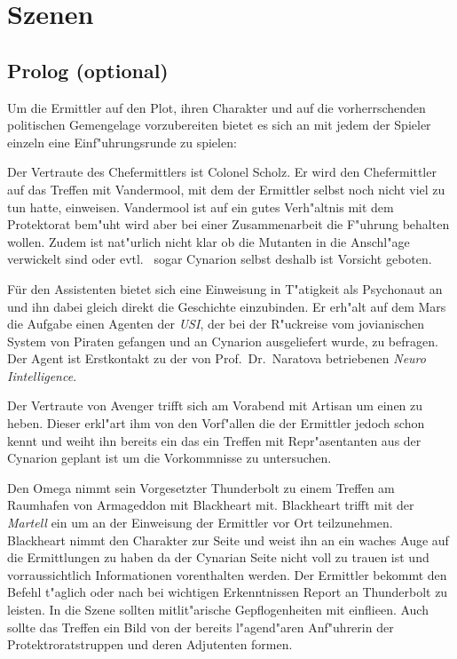 \section{Szenen}

\subsection{Prolog (optional)}

Um die Ermittler auf den Plot, ihren Charakter und auf die vorherrschenden politischen Gemengelage vorzubereiten bietet es sich an mit jedem der Spieler einzeln eine Einf"uhrungsrunde zu spielen:

Der Vertraute des Chefermittlers ist Colonel Scholz. Er wird den Chefermittler auf das Treffen mit Vandermool, mit dem der Ermittler selbst noch nicht viel zu tun hatte, einweisen. Vandermool ist auf ein gutes Verh"altnis mit dem Protektorat bem"uht wird aber bei einer Zusammenarbeit die F"uhrung behalten wollen. Zudem ist nat"urlich nicht klar ob die Mutanten in die Anschl"age verwickelt sind oder evtl. ~sogar Cynarion selbst deshalb ist Vorsicht geboten.

Für den Assistenten bietet sich eine Einweisung in T"atigkeit als Psychonaut an und ihn dabei gleich direkt die Geschichte einzubinden. Er erh"alt auf dem Mars die Aufgabe einen Agenten der \emph{USI}, der bei der R"uckreise vom jovianischen System von Piraten gefangen und an Cynarion ausgeliefert wurde, zu befragen. Der Agent ist Erstkontakt zu der von Prof.~Dr.~Naratova betriebenen \emph{Neuro Iintelligence}.

Der Vertraute von Avenger trifft sich am Vorabend mit Artisan um einen zu heben. Dieser erkl"art ihm von den Vorf"allen die der Ermittler jedoch schon kennt und weiht ihn bereits ein das ein Treffen mit Repr"asentanten aus der Cynarion geplant ist um die Vorkommnisse zu untersuchen.

Den Omega nimmt sein Vorgesetzter Thunderbolt zu einem Treffen am Raumhafen von Armageddon mit Blackheart mit. Blackheart trifft mit der \emph{Martell} ein um an der Einweisung der Ermittler vor Ort teilzunehmen. Blackheart nimmt den Charakter zur Seite und weist ihn an ein waches Auge auf die Ermittlungen zu haben da der Cynarian Seite nicht voll zu trauen ist und vorraussichtlich Informationen vorenthalten werden.
Der Ermittler bekommt den Befehl t"aglich oder nach bei wichtigen Erkenntnissen Report an Thunderbolt zu leisten. In die Szene sollten mitlit"arische Gepflogenheiten mit einflie\3en. Auch sollte das Treffen ein Bild von der bereits l"agend"aren Anf"uhrerin der Protektroratstruppen und deren Adjutenten formen.

